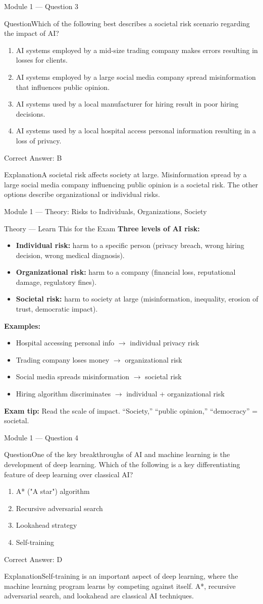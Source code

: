 \documentclass[aspectratio=169,10pt]{beamer}
\newcommand{\question}[1]{\begin{block}{Question}#1\end{block}}
\newcommand{\options}[4]{%
	\begin{enumerate}[label=\Alph*.,leftmargin=*]
		\item #1
		\item #2
		\item #3
		\item #4
	\end{enumerate}
}
\newcommand{\answerbox}[1]{\begin{exampleblock}{Correct Answer: #1}\end{exampleblock}}
\newcommand{\explain}[1]{\begin{block}{Explanation}#1\end{block}}
\newcommand{\theory}[1]{%
	\begin{block}{Theory --- Learn This for the Exam}
		\small #1
	\end{block}
}
\begin{document}
	\begin{frame}{Module 1 --- Question 3}
		\question{Which of the following best describes a societal risk scenario regarding the impact of AI?}
		\options{AI systems employed by a mid-size trading company makes errors resulting in losses for clients.}{AI systems employed by a large social media company spread misinformation that influences public opinion.}{AI systems used by a local manufacturer for hiring result in poor hiring decisions.}{AI systems used by a local hospital access personal information resulting in a loss of privacy.}
		\answerbox{B}
		\explain{A societal risk affects society at large. Misinformation spread by a large social media company influencing public opinion is a societal risk. The other options describe organizational or individual risks.}
	\end{frame}
	
	\begin{frame}{Module 1 --- Theory: Risks to Individuals, Organizations, Society}
		\theory{
			\textbf{Three levels of AI risk:}
			\begin{itemize}
				\item \textbf{Individual risk:} harm to a specific person (privacy breach, wrong hiring decision, wrong medical diagnosis).
				\item \textbf{Organizational risk:} harm to a company (financial loss, reputational damage, regulatory fines).
				\item \textbf{Societal risk:} harm to society at large (misinformation, inequality, erosion of trust, democratic impact).
			\end{itemize}
			\textbf{Examples:}
			\begin{itemize}
				\item Hospital accessing personal info $\rightarrow$ individual privacy risk
				\item Trading company loses money $\rightarrow$ organizational risk
				\item Social media spreads misinformation $\rightarrow$ societal risk
				\item Hiring algorithm discriminates $\rightarrow$ individual + organizational risk
			\end{itemize}
			\textbf{Exam tip:} Read the scale of impact. ``Society,'' ``public opinion,'' ``democracy'' = societal.
		}
	\end{frame}
	
	\begin{frame}{Module 1 --- Question 4}
		\question{One of the key breakthroughs of AI and machine learning is the development of deep learning. Which of the following is a key differentiating feature of deep learning over classical AI?}
		\options{A* ("A star") algorithm}{Recursive adversarial search}{Lookahead strategy}{Self-training}
		\answerbox{D}
		\explain{Self-training is an important aspect of deep learning, where the machine learning program learns by competing against itself. A*, recursive adversarial search, and lookahead are classical AI techniques.}
	\end{frame}
	
\end{document}
